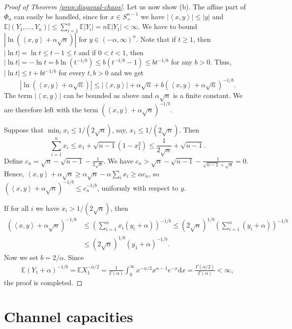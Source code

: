 \documentclass[11pt]{amsart}
\newcommand{\dd}{\mathrm{d}}
\newcommand{\1}{\mathbf{1}}
\newcommand{\E}{\mathbb{E}}
\newcommand{\abs}[1]{\left\vert #1 \right\vert}
\newcommand{\scal}[2]{\left\langle #1, #2\right\rangle}
\theoremstyle{definition}
\theoremstyle{definition}
\theoremstyle{remark}
\begin{document}
\begin{proof}[Proof of Theorem \ref{prop:diagonal-chaos}]
Let us now show (b). The affine part of $\Phi_n$ can easily be handled, since for $x \in S_+^{n-1}$ we have $\abs{\scal{x}{y}} \leq |y|$ and $\E \abs{(Y_1,\ldots, Y_n)} \leq \sum_{i=1}^n \E|Y_i| = n \E |Y_1|<\infty$. We have to bound $\abs{\ln(\scal{x}{y}+\alpha\sqrt{n})}$ for $y \in (-\alpha,\infty)^n$. Note that if $t \geq 1$, then $\abs{\ln t} = \ln t \leq t-1 \leq t$ and if $0<t<1$, then $\abs{\ln t} = -\ln t=b \ln (t^{-1/b}) \leq b(t^{-1/b}-1) \leq b t^{-1/b}$ for any $b>0$. Thus, $\abs{\ln t} \leq t+ b t^{-1/b}$ for every $t,b>0$ and we get
\[
	\abs{\ln(\scal{x}{y}+\alpha\sqrt{n})} \leq \abs{\scal{x}{y}} + \alpha\sqrt{n} + b (\scal{x}{y}+\alpha\sqrt{n})^{-1/b}.
\]
The term $\abs{\scal{x}{y}}$ can be bounded as above and $\alpha\sqrt{n}$ is a finite constant. We are therefore left with the term $(\scal{x}{y}+\alpha\sqrt{n})^{-1/b}$. 

Suppose that  $ \min_i x_i \le 1/(2 \sqrt{n})$, say, $x_1 \leq 1/(2 \sqrt{n})$. Then 
\[
\sum_{i=1}^n x_i \leq x_1 + \sqrt{n-1}(1-x_1^2) \leq \frac{1}{2 \sqrt{n}} + \sqrt{n-1}. 
\] 
Define $c_n = \sqrt{n}-\sqrt{n-1}- \frac{1}{2 \sqrt{n}}$. We have $c_n>\sqrt{n}-\sqrt{n-1}- \frac{1}{\sqrt{n-1}+ \sqrt{n}}=0$. Hence, $\scal{x}{y}+\alpha\sqrt{n} \geq \alpha\sqrt{n}-\alpha\sum_{i} x_i  \geq \alpha c_n$, so $(\scal{x}{y}+\alpha\sqrt{n})^{-1/b} \leq c_n^{-1/b}$, uniformly with respect to $y$. 

If for all $i$ we have $x_i > 1/(2\sqrt{n})$, then 
\begin{align*}
  (\scal{x}{y}+\alpha\sqrt{n})^{-1/b} & \leq \left(\sum_{i=1}^n x_i(y_i+\alpha) \right)^{-1/b} \leq (2\sqrt{n})^{1/b} \left(\sum_{i=1}^n (y_i+\alpha) \right)^{-1/b} \\ & \leq (2\sqrt{n})^{1/b} (y_1+\alpha)^{-1/b}.
\end{align*}
Now we set $b=2/\alpha$. Since 
\begin{align*}
    \E(Y_1+\alpha)^{-1/b} = \E X_1^{-\alpha/2} = \frac{1}{\Gamma(\alpha)}\int_0^\infty x^{-\alpha/2}x^{\alpha-1}e^{-x}\dd x = \frac{\Gamma(\alpha/2)}{\Gamma(\alpha)}<\infty,
\end{align*}the proof is completed.
\end{proof}

\section{Channel capacities}\label{sec:capacity}
\end{document}

